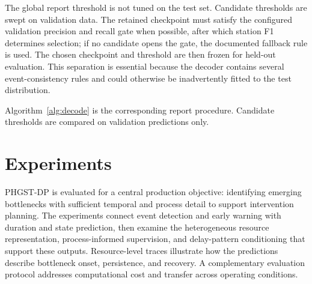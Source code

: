 \documentclass[a4paper,fleqn]{cas-dc}
\begin{document}
The global report threshold is not tuned on the test set. Candidate thresholds are swept on validation data. The retained checkpoint must satisfy the configured validation precision and recall gate when possible, after which station F1 determines selection; if no candidate opens the gate, the documented fallback rule is used. The chosen checkpoint and threshold are then frozen for held-out evaluation. This separation is essential because the decoder contains several event-consistency rules and could otherwise be inadvertently fitted to the test distribution.


Algorithm~\ref{alg:decode} is the corresponding report procedure. Candidate thresholds are compared on validation predictions only.


\begin{algorithm}[t]
\caption{Report decoding on validation.}
\label{alg:decode}
\;
\;
\end{algorithm}

\section{Experiments}\label{sec:exp}

PHGST-DP is evaluated for a central production objective: identifying emerging bottlenecks with sufficient temporal and process detail to support intervention planning. The experiments connect event detection and early warning with duration and state prediction, then examine the heterogeneous resource representation, process-informed supervision, and delay-pattern conditioning that support these outputs. Resource-level traces illustrate how the predictions describe bottleneck onset, persistence, and recovery. A complementary evaluation protocol addresses computational cost and transfer across operating conditions.
\end{document}
